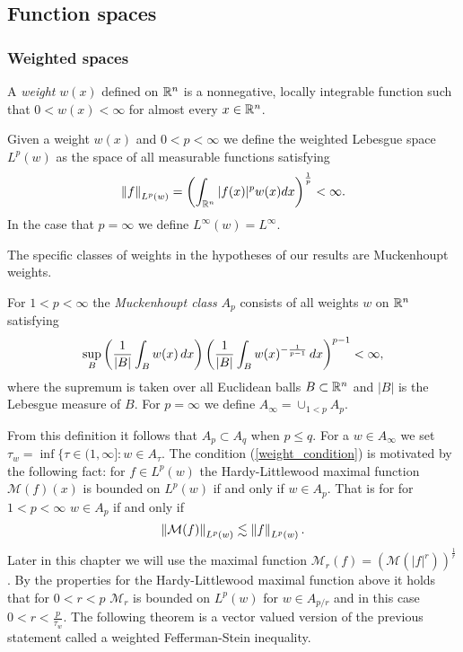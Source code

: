 \subsection{Function spaces}

\subsubsection{Weighted spaces}

\begin{dfn}
A \textit{weight} $w(x)$ defined on ${{\mathbb R}^n}$ is a nonnegative, locally integrable function such that $0<w(x)<\infty$ for almost every $x\in{{\mathbb R}^n}$.
\end{dfn}

Given a weight $w(x)$ and $0<p<\infty$ we define the weighted Lebesgue space $L^p(w)$ as the space of all measurable functions satisfying 
\[ \left\|f\right\|_{L^p(w)} = \left(\int_{{\mathbb R}^n} |f(x)|^p w(x)dx\right)^{\frac{1}{p}} < \infty. \]
In the case that $p=\infty$ we define $L^\infty (w) = L^\infty$. 

The specific classes of weights in the hypotheses of our results are Muckenhoupt weights. 
\begin{dfn}
For $1<p<\infty$ the \textit{Muckenhoupt class} $A_p$ consists of all weights $w$ on ${{\mathbb R}^n}$ satisfying 
 \begin{equation}\label{weight_condition}
 \sup_B\left(\frac{1}{\left\vert B \right\vert}\int_Bw(x)\, dx\right)\left(\frac{1}{\left\vert B \right\vert}\int_Bw(x)^{-\frac{1}{p-1}}\, dx\right)^{p-1}<\infty,
 \end{equation}
where the supremum is taken over all Euclidean balls $B\subset{{\mathbb R}^n}$ and $|B|$ is the Lebesgue measure of $B$. For $p=\infty$ we define $A_\infty = \cup_{1<p} A_p$. 
\end{dfn}

From this definition it follows that $A_p \subset A_q$ when $p\leq q$. 
For a $w\in A_\infty$ we set 
$\tau_w = \inf\{\tau \in (1,\infty]: w\in A_\tau $. 
The condition (\ref{weight_condition}) is motivated by the following fact: for $f\in L^p(w)$ the Hardy-Littlewood maximal function $\mathcal{M}(f)(x)$ is bounded on $L^p(w)$ if and only if $w\in A_p$. That is for for $1<p<\infty$ $w\in A_p$ if and only if 
\[\left\|\mathcal{M}(f)\right\|_{L^p (w)} \lesssim \left\|f\right\|_{L^p (w)}. \]
Later in this chapter we will use the maximal function $\mathcal{M}_r (f) = \left(\mathcal{M}(|f|^r)\right)^{\frac{1}{r}}$. By the properties for the Hardy-Littlewood maximal function above it holds that for $0<r<p$ $\mathcal{M}_r$ is bounded on $L^p (w)$ for $w\in A_{p/r}$ and in this case $0<r<\frac{p}{\tau_w}$. The following theorem is a vector valued version of the previous statement called a weighted Fefferman-Stein inequality.

